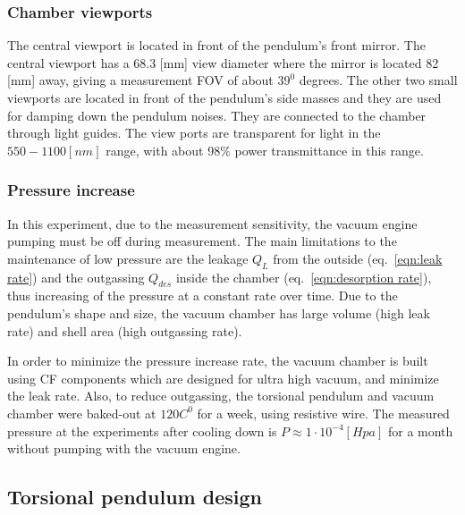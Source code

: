 \documentclass[\main/master.tex]{subfiles}
\begin{document}
\subsubsection{Chamber viewports}
\par\noindent
The central viewport is located in front of the pendulum's front mirror. The central viewport has a 68.3 [mm] view diameter where the mirror is located 82 [mm] away, giving a measurement FOV of about $39^0$ degrees. The other two small viewports are located in front of the pendulum's side masses and they are used for damping down the pendulum noises. They are connected to the chamber through light guides. The view ports are transparent for light in the $550-1100 [nm]$ range, with about 98$\%$ power transmittance in this range. 


\subsubsection{Pressure increase}
\par\noindent
In this experiment, due to the measurement sensitivity, the vacuum engine pumping must be off during measurement. The main limitations to the maintenance of low pressure are the leakage $Q_L$ from the outside (eq.~\ref{eqn:leak rate}) and the outgassing $Q_{des}$ inside the chamber (eq.~\ref{eqn:desorption rate}), thus increasing of the pressure at a constant rate over time. Due to the pendulum's shape and size, the vacuum chamber has large volume (high leak rate) and shell area (high outgassing rate).
\par\noindent
In order to minimize the pressure increase rate, the vacuum chamber is built using CF components which are designed for ultra high vacuum, and minimize the leak rate. Also, to reduce outgassing, the torsional pendulum and vacuum chamber were baked-out at $120 C^0$ for a week, using resistive wire. The measured pressure at the experiments after cooling down is $P \approx 1\cdot 10^{−4} [Hpa]$ for a month without pumping with the vacuum engine.
\subsection{Torsional pendulum design}
\end{document}

